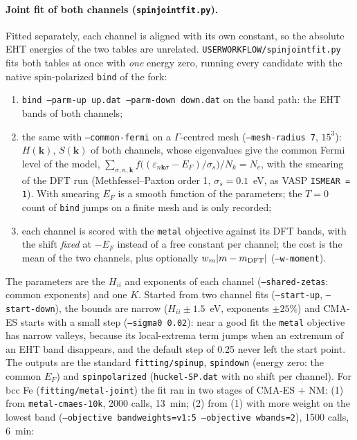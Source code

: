 \documentclass[11pt,a4paper]{article}
\newcommand{\cmd}[1]{\texttt{#1}}
\renewcommand{\_}{\origunderscore\allowbreak}
\begin{document}
\paragraph{Joint fit of both channels (\cmd{spin\_joint\_fit.py}).} Fitted separately, each channel is aligned with its
own constant, so the absolute EHT energies of the two tables are unrelated. \cmd{USER\_WORKFLOW/spin\_joint\_fit.py} fits both
tables at once with \emph{one} energy zero, running every candidate with the native spin-polarized \cmd{bind} of the fork:
\begin{enumerate}[nosep]
\item \cmd{bind --parm-up up.dat --parm-down down.dat} on the band path: the EHT bands of both channels;
\item the same with \cmd{--common-fermi} on a $\Gamma$-centred mesh (\cmd{--mesh-radius 7}, $15^3$): $H(\mathbf k)$, $S(\mathbf k)$ of
  both channels, whose eigenvalues give the common Fermi level of the model,
  $\sum_{\sigma,n,\mathbf k} f\big((\varepsilon_{n\mathbf k\sigma}-E_F)/\sigma_s\big)/N_k = N_e$, with the smearing of the DFT run
  (Methfessel--Paxton order 1, $\sigma_s=0.1$~eV, as VASP \cmd{ISMEAR = 1}). With smearing $E_F$ is a smooth function of the
  parameters; the $T=0$ count of \cmd{bind} jumps on a finite mesh and is only recorded;
\item each channel is scored with the \cmd{metal} objective against its DFT bands, with the shift \emph{fixed} at $-E_F$ instead of a
  free constant per channel; the cost is the mean of the two channels, plus optionally $w_m|m-m_{\rm DFT}|$ (\cmd{--w-moment}).
\end{enumerate}
The parameters are the $H_{ii}$ and exponents of each channel (\cmd{--shared-zetas}: common exponents) and one $K$. Started from
two channel fits (\cmd{--start-up}, \cmd{--start-down}), the bounds are narrow ($H_{ii}\pm1.5$~eV, exponents $\pm25\%$) and CMA-ES
starts with a small step (\cmd{--sigma0 0.02}): near a good fit the \cmd{metal} objective has narrow valleys, because its
local-extrema term jumps when an extremum of an EHT band disappears, and the default step of 0.25 never left the start point. The
outputs are the standard \cmd{fitting/spin\_up}, \cmd{spin\_down} (energy zero: the common $E_F$) and \cmd{spin\_polarized}
(\cmd{huckel-SP.dat} with no shift per channel). For bcc Fe (\cmd{fitting/metal-joint}) the fit ran in two stages of CMA-ES + NM:
(1) from \cmd{metal-cmaes-10k}, 2000 calls, 13~min; (2) from (1) with more weight on the lowest band
(\cmd{--objective band\_weights=v1:5 --objective w\_bands=2}), 1500 calls, 6~min:
\end{document}
